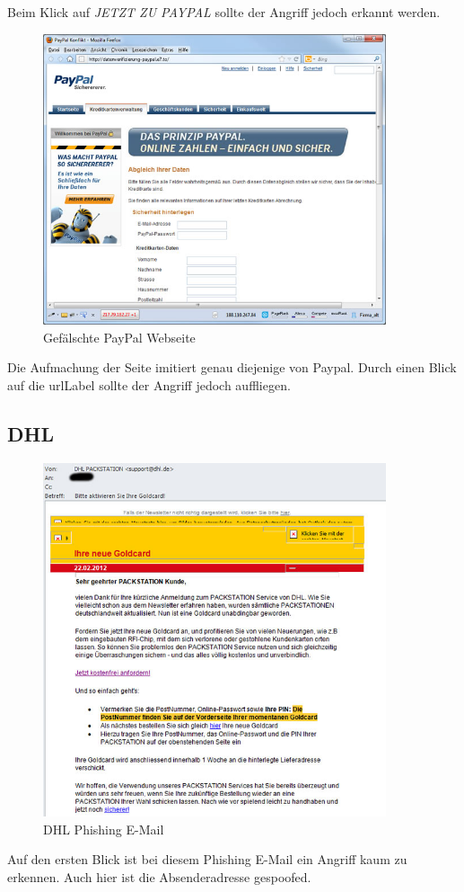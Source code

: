 Beim Klick auf \textit{JETZT ZU PAYPAL} sollte der Angriff jedoch erkannt werden.
\begin{figure}[H]
  \centering
  \includegraphics[width=0.9\textwidth]{images/phishing-beispiel-paypal4.jpg}
  \caption{Gefälschte PayPal Webseite}
  \label{fig:phishing:beispiele:paypalfortgeschrittenwebseite}
\end{figure}
Die Aufmachung der Seite imitiert genau diejenige von Paypal. Durch einen Blick auf die \Gls{urlLabel} sollte der Angriff jedoch auffliegen.

\subsection{DHL}
\begin{figure}[H]
  \centering
  \includegraphics[width=0.9\textwidth]{images/phishing-beispiel-dhl.jpg}
  \caption{DHL Phishing E-Mail}
  \label{fig:phishing:beispiele:dhl}
\end{figure}
Auf den ersten Blick ist bei diesem Phishing E-Mail ein Angriff kaum zu erkennen. Auch hier ist die Absenderadresse gespoofed.

